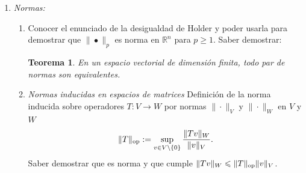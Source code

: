 \documentclass[12pt]{amsart}
\newtheorem{theorem}[lemma]{Teorema}
\theoremstyle{definition}
\renewcommand{\geq}{\geqslant}
\renewcommand{\leq}{\leqslant}
\newcommand{\CC}{\ensuremath{\mathbb{C}}}
\newcommand{\RR}{\ensuremath{\mathbb{R}}}
\begin{document}
\begin{enumerate}
\begin{enumerate}
\begin{itemize}
\item La demostración de existencia es constructiva (si pudiéramos calcular valores y vectores propios, lo que haremos más adelante) pues se reduce a que:
\begin{enumerate}
\item Las columnas de $U$ pueden ser una base ortonormal de vectores propios de $AA^T$ (con $AA^Tu_i=\sigma_i^2u_i$), extendida a una base ortonormal del espacio completo si el rango lo requiere.
\item Las columnas de $V$ pueden ser una base ortonormal de vectores propios de $A^TA$ (con $A^tAv_i=\sigma_i^2v_i$), extendida a una base ortonormal del espacio completo si el rango lo requiere.
\item Los valores singulares son las raíces de los valores propios no nulos de $AA^T$ \'o $A^TA$. Esto demuestra la unicidad de los valores singulares y tambien explica en qué sentido falla la unicidad de $U$ y $V$.
\end{enumerate}
\item $\Sigma$ es, en general una matrix rectangular del mismo formato que $A$ y sus únicas entradas no nulas estan sobre la diagonal.
\item La descomposición de arriba permite, sumando sobre las entradas diagonales, escribir 
\[A=\sum_{i=1}^r \sigma_i u_iv_i^t\]
expresando $A$ como suma de $r$ matrices de rango uno.
\item Todo lo anterior es válido sobre $\CC$, donde $A\in \CC^{m\times n}$ y las matrices $U$ y $V$ son unitarias, llevando a una descomposición 
\[A=U\Sigma V^*\]
\end{itemize}
\end{enumerate}

\item \emph{Normas:}
\begin{enumerate}
\item Conocer el enunciado de la desigualdad de Holder y poder usarla para demostrar que $\|\bullet\|_p$ es norma en $\RR^n$ para $p\geq 1$. Saber demostrar:

\begin{theorem}
En un espacio vectorial de dimensión finita, todo par de normas son equivalentes.
\end{theorem}


\item \emph{Normas inducidas en espacios de matrices} Definición de la norma inducida sobre operadores $T:V\rightarrow W$ por normas $\|\cdot\|_V$ y $\|\cdot\|_W$ en $V$ y $W$
\[\|T\|_{\rm op}:=\sup_{v\in V\setminus\{0\}} \frac{\|Tv\|_W}{\|v\|_V}.\] 
Saber demostrar que es norma y que cumple $\|Tv\|_W\leq \|T\|_{\rm op}\|v\|_V$. 


\end{enumerate}
\end{enumerate}
\end{document}
